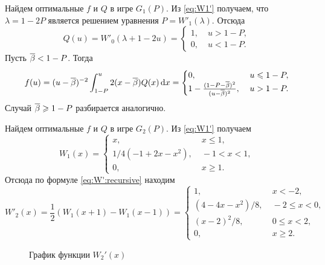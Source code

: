 {\begin{example}
  Найдем оптимальные $f$ и $Q$ в игре $G_1(P)$.
  Из \eqref{eq:W1'} получаем, что $\lambda = 1 - 2P$ является решением уравнения $P = W'_1(\lambda)$.
  Отсюда
  \begin{equation*}
    Q(u) = W'_0(\lambda + 1 - 2u) = \begin{cases}
      1, &\; u > 1 - P,\\
      0, &\; u < 1 - P.
    \end{cases}
  \end{equation*}
  Пусть ${\overline{\beta}} < 1 - P$.
  Тогда
  \begin{equation*}
    f(u) = (u - {\overline{\beta}})^{-2} \int_{1-P}^u 2 (x - {\overline{\beta}}) Q(x) \mathop{}\!\mathrm{d} x =
    \begin{cases}
      0, &\; u \leqslant 1 - P,\\
      1 - \frac{(1 - P - {\overline{\beta}})^2}{(u-{\overline{\beta}})^2}, &\; u > 1 - P.
    \end{cases}
  \end{equation*}
  Случай ${\overline{\beta}} \geqslant 1 - P$ разбирается аналогично.
\end{example}

\begin{example}
  Найдем оптимальные $f$ и $Q$ в игре $G_2(P)$.
  Из \eqref{eq:W1'} получаем
  \begin{equation*}
    W_1(x) = \begin{cases}
      x, &\; x \leqslant 1,\\
      1/4 (-1 + 2x - x^2), &\; -1 < x < 1,\\
      0, &\; x \geqslant 1.
    \end{cases}
  \end{equation*}
  Отсюда по формуле \eqref{eq:W':recursive} находим
  \begin{equation*}
    W'_2(x) = \frac{1}{2} \left( W_1(x+1) - W_1(x-1) \right) = \begin{cases}
      1, &\; x < -2,\\
      (4 - 4x - x^2)/8, &\; -2 \leqslant x < 0,\\
      (x - 2)^2/8, &\; 0 \leqslant x < 2,\\
      0, &\; x \geqslant 2.
    \end{cases}
  \end{equation*}

  \begin{figure}[h!]
    \centering
    
    \caption{График функции $W_2'(x)$}
    \label{fig:w2}
  \end{figure}


\end{example}}
